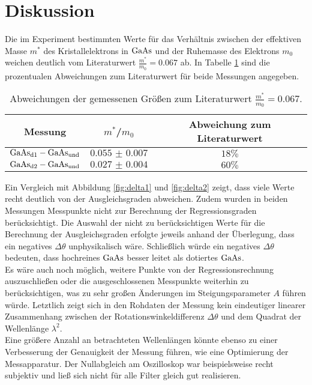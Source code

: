\section{Diskussion}
\label{sec:Diskussion}
Die im Experiment bestimmten Werte für das Verhältnis zwischen der effektiven Masse $m^{*}$ des Kristallelektrons in $\ce{GaAs}$ und der Ruhemasse des Elektrons $m_{0}$ weichen deutlich vom Literaturwert
$\frac{m^{*}}{m_{0}}=0.067$ ab. In Tabelle \ref{tab:diskussion} sind die prozentualen Abweichungen zum Literaturwert für beide Messungen angegeben.
\begin{table}
  \centering
  \caption{Abweichungen der gemessenen Größen zum Literaturwert $\frac{m^{*}}{m_{0}}=0.067$.}
  \label{tab:diskussion}
  \begin{tabular}{ccc}
    \toprule
    Messung&$m^{*}$/$m_{0}$&Abweichung zum Literaturwert\\
    \midrule
    $\ce{GaAs}_{\mathrm{d1}}-\ce{GaAs}_{\mathrm{und}}$&$\num{0.055(7)}$&$18\%$\\
    $\ce{GaAs}_{\mathrm{d2}}-\ce{GaAs}_{\mathrm{und}}$&$\num{0.027(4)}$&$60\%$\\
    \bottomrule
  \end{tabular}
\end{table}
Ein Vergleich mit Abbildung \ref{fig:delta1} und \ref{fig:delta2} zeigt, dass viele Werte recht deutlich von der Ausgleichsgraden abweichen. Zudem wurden in beiden Messungen Messpunkte nicht zur Berechnung der Regressionsgraden berücksichtigt. Die Auswahl der nicht zu berücksichtigen Werte für die Berechnung der Ausgleichsgraden erfolgte jeweils anhand der Überlegung, dass ein negatives $\Delta\theta$ unphysikalisch wäre. Schließlich würde ein negatives $\Delta\theta$ bedeuten, dass hochreines $\ce{GaAs}$ besser leitet als dotiertes $\ce{GaAs}$.\\
Es wäre auch noch möglich, weitere Punkte von der Regressionsrechnung auszuschließen oder die ausgeschlossenen Messpunkte weiterhin zu berücksichtigen, was zu sehr großen Änderungen im Steigungsparameter $A$ führen würde.
Letztlich zeigt sich in den Rohdaten der Messung kein eindeutiger linearer Zusammenhang zwischen der Rotationswinkeldifferenz $\Delta\theta$ und dem Quadrat der Wellenlänge $\lambda^{2}$.\\
Eine größere Anzahl an betrachteten Wellenlängen könnte ebenso zu einer Verbesserung der Genauigkeit der Messung führen, wie eine Optimierung der Messapparatur.
Der Nullabgleich am Oszilloskop war beispielsweise recht subjektiv und ließ sich nicht für alle Filter gleich gut realisieren.

